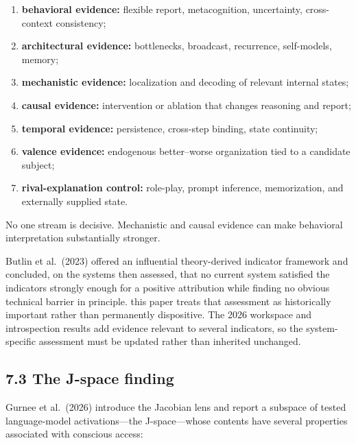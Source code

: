 \documentclass[
  11pt,
]{article}
\providecommand{\tightlist}{%
  \setlength{\itemsep}{0pt}\setlength{\parskip}{0pt}}
\begin{document}
\begin{enumerate}
\def\labelenumi{\arabic{enumi}.}
\tightlist
\item
  \textbf{behavioral evidence:} flexible report, metacognition,
  uncertainty, cross-context consistency;
\item
  \textbf{architectural evidence:} bottlenecks, broadcast, recurrence,
  self-models, memory;
\item
  \textbf{mechanistic evidence:} localization and decoding of relevant
  internal states;
\item
  \textbf{causal evidence:} intervention or ablation that changes
  reasoning and report;
\item
  \textbf{temporal evidence:} persistence, cross-step binding, state
  continuity;
\item
  \textbf{valence evidence:} endogenous better--worse organization tied
  to a candidate subject;
\item
  \textbf{rival-explanation control:} role-play, prompt inference,
  memorization, and externally supplied state.
\end{enumerate}

No one stream is decisive. Mechanistic and causal evidence can make
behavioral interpretation substantially stronger.

Butlin et al.~(2023) offered an influential theory-derived indicator
framework and concluded, on the systems then assessed, that no current
system satisfied the indicators strongly enough for a positive
attribution while finding no obvious technical barrier in principle.
this paper treats that assessment as historically important rather than
permanently dispositive. The 2026 workspace and introspection results
add evidence relevant to several indicators, so the system-specific
assessment must be updated rather than inherited unchanged.

\subsection{7.3 The J-space finding}\label{the-j-space-finding}

Gurnee et al.~(2026) introduce the Jacobian lens and report a subspace
of tested language-model activations---the J-space---whose contents have
several properties associated with conscious access:
\end{document}
